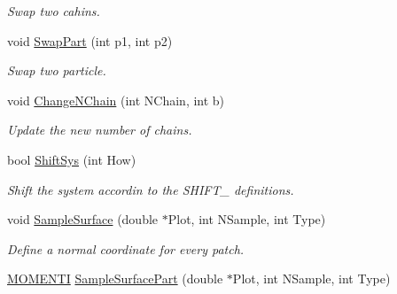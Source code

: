 \begin{DoxyCompactItemize}
\begin{DoxyCompactList}\small\item\em \-Swap two cahins. \end{DoxyCompactList}\item 
\hypertarget{classVarData_a8ba9acea35fd51296eda97612a51cff1}{void \hyperlink{classVarData_a8ba9acea35fd51296eda97612a51cff1}{\-Swap\-Part} (int p1, int p2)}\label{classVarData_a8ba9acea35fd51296eda97612a51cff1}

\begin{DoxyCompactList}\small\item\em \-Swap two particle. \end{DoxyCompactList}\item 
\hypertarget{classVarData_a91c4722a7eea67c5d5ddefedf07b9ba4}{void \hyperlink{classVarData_a91c4722a7eea67c5d5ddefedf07b9ba4}{\-Change\-N\-Chain} (int \-N\-Chain, int b)}\label{classVarData_a91c4722a7eea67c5d5ddefedf07b9ba4}

\begin{DoxyCompactList}\small\item\em \-Update the new number of chains. \end{DoxyCompactList}\item 
\hypertarget{classVarData_abc02299ea6cc594c4a1a31862ded3019}{bool \hyperlink{classVarData_abc02299ea6cc594c4a1a31862ded3019}{\-Shift\-Sys} (int \-How)}\label{classVarData_abc02299ea6cc594c4a1a31862ded3019}

\begin{DoxyCompactList}\small\item\em \-Shift the system accordin to the \-S\-H\-I\-F\-T\-\_\- definitions. \end{DoxyCompactList}\item 
\hypertarget{classVarData_aba8419a8fffac92d2f0855c9507dda75}{void \hyperlink{classVarData_aba8419a8fffac92d2f0855c9507dda75}{\-Sample\-Surface} (double $\ast$\-Plot, int \-N\-Sample, int \-Type)}\label{classVarData_aba8419a8fffac92d2f0855c9507dda75}

\begin{DoxyCompactList}\small\item\em \-Define a normal coordinate for every patch. \end{DoxyCompactList}\item 
\hypertarget{classVarData_a9e9c6efa2057436c2d691a584f1cbdeb}{\hyperlink{structMOMENTI}{\-M\-O\-M\-E\-N\-T\-I} \hyperlink{classVarData_a9e9c6efa2057436c2d691a584f1cbdeb}{\-Sample\-Surface\-Part} (double $\ast$\-Plot, int \-N\-Sample, int \-Type)}\label{classVarData_a9e9c6efa2057436c2d691a584f1cbdeb}


\end{DoxyCompactItemize}
